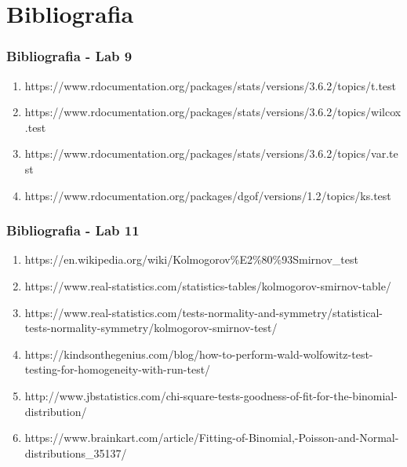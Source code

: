 \documentclass{article}
\begin{document}
\newpage
\part{Bibliografia}

\section{Bibliografia - Lab 9}
\begin{enumerate}[ label = (\arabic*)]
\item https://www.rdocumentation.org/packages/stats/versions/3.6.2/topics/t.test
\item https://www.rdocumentation.org/packages/stats/versions/3.6.2/topics/wilcox.test
\item https://www.rdocumentation.org/packages/stats/versions/3.6.2/topics/var.test
\item https://www.rdocumentation.org/packages/dgof/versions/1.2/topics/ks.test
\end{enumerate}

\section{Bibliografia - Lab 11}
\begin{enumerate}[ label = (\arabic*)]
\item https://en.wikipedia.org/wiki/Kolmogorov\%E2\%80\%93Smirnov\_test
\item https://www.real-statistics.com/statistics-tables/kolmogorov-smirnov-table/
\item https://www.real-statistics.com/tests-normality-and-symmetry/statistical-tests-normality-symmetry/kolmogorov-smirnov-test/
\item https://kindsonthegenius.com/blog/how-to-perform-wald-wolfowitz-test-testing-for-homogeneity-with-run-test/
\item http://www.jbstatistics.com/chi-square-tests-goodness-of-fit-for-the-binomial-distribution/
\item https://www.brainkart.com/article/Fitting-of-Binomial,-Poisson-and-Normal-distributions\_35137/
\end{enumerate}
\end{document}
